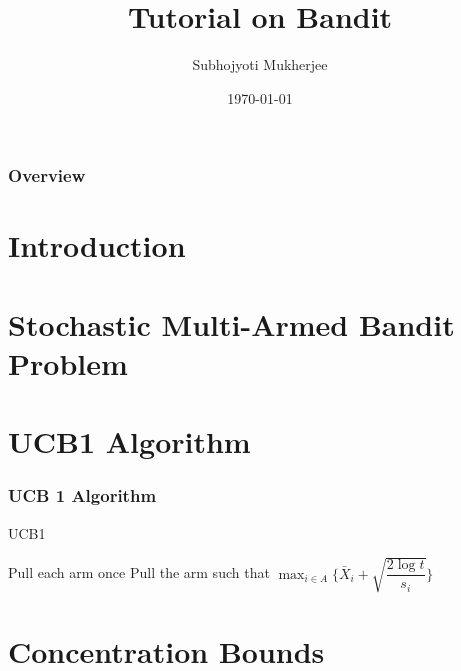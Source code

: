 \documentclass{beamer}
\title[Tutorial on Bandit]{Tutorial on Bandit} %
\author{Subhojyoti Mukherjee} %
\institute[IIT Madras] %
{
IIT Madras \\ %
\medskip
}
\date{\today} %
\begin{document}
\nocite{*}
\begin{frame}
\titlepage %
\end{frame}

\begin{frame}
\frametitle{Overview} %
\tableofcontents %
\end{frame}



\section{Introduction}


\section{Stochastic Multi-Armed Bandit Problem}


\section{UCB1 Algorithm}
\begin{frame}
\frametitle{UCB 1 Algorithm}
\begin{algorithm}[H]
\caption{UCB1}
\begin{algorithmic}[1]
\State Pull each arm once
\State Pull the arm such that $\max_{i\in A}\bigg\lbrace\bar{X}_{i} + \sqrt{\dfrac{2\log t}{s_i}}\bigg\rbrace$
 \EndFor
\end{algorithmic}
\end{algorithm}
\cite{auer2002finite}
\end{frame}

\section{Concentration Bounds}

\end{document}

